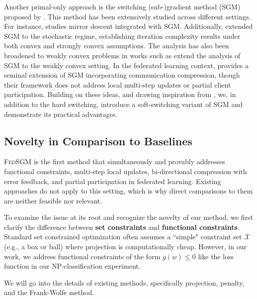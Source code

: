 \documentclass{article} %
\begin{document}
Another primal-only approach is the switching (sub-)gradient method (SGM) proposed by \citet{polyak1967general}. This method has been extensively studied across different settings. For instance, \citet{titov2018mirror,stonyakin2019mirror,alkousa2020modification} studies mirror descent integrated with SGM. Additionally, \cite{lan2020algorithms} extended SGM to the stochastic regime, establishing iteration complexity results under both convex and strongly convex assumptions. The analysis has also been broadened to weakly convex problems in works such as \citet{huang2023oracle,liu2025single,ma2020quadratically,jia2025first} extend the analysis of SGM to the weakly convex setting. In the federated learning context, \citet{islamov2025safe} provides a seminal extension of SGM incorporating communication compression, though their framework does not address local multi-step updates or partial client participation. Building on these ideas, and drawing inspiration from \cite{upadhyay2025optimization}, we, in addition to the hard switching, introduce a soft-switching variant of SGM and demonstrate its practical advantages.


\subsection{Novelty in Comparison to Baselines}
\textsc{FedSGM} is the first method that simultaneously and provably addresses functional constraints, multi-step local updates, bi-directional compression with error feedback, and partial participation in federated learning. Existing approaches do not apply to this setting, which is why direct comparisons to them are neither feasible nor relevant.

To examine the issue at its root and recognize the novelty of our method, we first clarify the difference between \textbf{set constraints} and \textbf{functional constraints}. Standard set constrained optimization often assumes a ``simple" constraint set $\mathcal{X}$ (e.g., a box or ball) where projection is computationally cheap. However, in our work, we address functional constraints of the form $g(w) \leq 0$ like the loss function in our NP-classification experiment.

We will go into the details of existing methods, specifically projection, penalty, and the Frank-Wolfe method.
\end{document}
